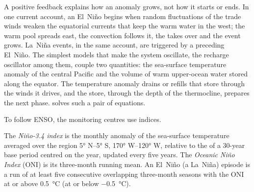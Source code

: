 \begin{omfigure}
\centering
{}
\par{}
\end{omfigure}

A positive feedback explains how an anomaly grows, not how it starts or ends. In one current account,
an El~Niño begins when random fluctuations of the trade winds weaken the equatorial currents that
keep the warm water in the west; the warm pool spreads east, the convection follows it, the
 takes over and the event grows. La~Niña events, in the same account, are
triggered by a preceding El~Niño. The simplest models that make the system oscillate, the recharge
oscillator among them, couple two quantities: the sea-surface temperature anomaly of the central
Pacific and the volume of warm upper-ocean water stored along the equator. The temperature
anomaly drains or refills that store through the winds it drives, and the store, through the
depth of the thermocline, prepares the next phase.  solves
such a pair of equations.

To follow ENSO, the monitoring centres use indices.

\begin{definition}\label{def:b2:climate-variability:oni}
The \emph{Niño-3.4 index} is the monthly anomaly of the sea-surface
temperature averaged over the region \ang{5} N--\ang{5} S, \ang{170} W--\ang{120} W, relative to
the  of a 30-year base period centred on the year, updated every five years. The
\emph{Oceanic Niño Index} (ONI) is its three-month running mean. An
El~Niño (a La~Niña) episode is a run of at least five consecutive overlapping three-month seasons
with the ONI at or above \qty{+0.5}{\celsius} (at or below \qty{-0.5}{\celsius}).
\end{definition}

